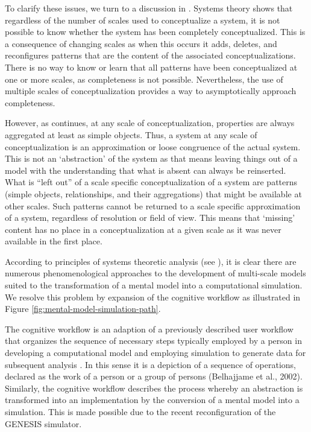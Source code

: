 \documentclass{article}
\begin{document}
To clarify these issues, we turn to a discussion in \cite{Heylighen:2006vn}. Systems theory shows that regardless of the number of scales used to conceptualize a system, it is not possible to know whether the system has been completely conceptualized. This is a consequence of changing scales as when this occurs it adds, deletes, and reconfigures patterns that are the content of the associated conceptualizations. There is no way to know or learn that all patterns have been conceptualized at one or more scales, as completeness is not possible. Nevertheless, the use of multiple scales of conceptualization provides a way to asymptotically approach completeness.
 
However, as \cite{Heylighen:2006vn} continues, at any scale of conceptualization, properties are always aggregated at least as simple objects. Thus, a system at any scale of conceptualization is an approximation or loose congruence of the actual system. This is not an `abstraction' of the system as that means leaving things out of a model with the understanding that what is absent can always be reinserted. What is ``left out'' of a scale specific conceptualization of a system are patterns (simple objects, relationships, and their aggregations) that might be available at other scales. Such patterns cannot be returned to a scale specific approximation of a system, regardless of resolution or field of view. This means that `missing' content has no place in a conceptualization at a given scale as it was never available in the first place.

According to principles of systems theoretic analysis (see \cite{Bertalanffy:1973zr,Heylighen:2006vn}), it is clear there are numerous phenomenological approaches to the development of multi-scale models suited to the transformation of a mental model into a computational simulation. We resolve this problem by expansion of the cognitive workflow as illustrated in Figure \ref{fig:mental-model-simulation-path}.

The cognitive workflow is an adaption of a previously described user workflow that organizes the sequence of necessary steps typically employed by a person in developing a computational model and employing simulation to generate data for subsequent analysis \cite{10.1371/journal.pone.0028956}. In this sense it is a depiction of a sequence of operations, declared as the work of a person or a group of persons (Belhajjame et al., 2002). Similarly, the cognitive workflow describes the process whereby an abstraction is transformed into an implementation by the conversion of a mental model into a simulation. This is made possible due to the recent reconfiguration of the GENESIS simulator. 
\end{document}
